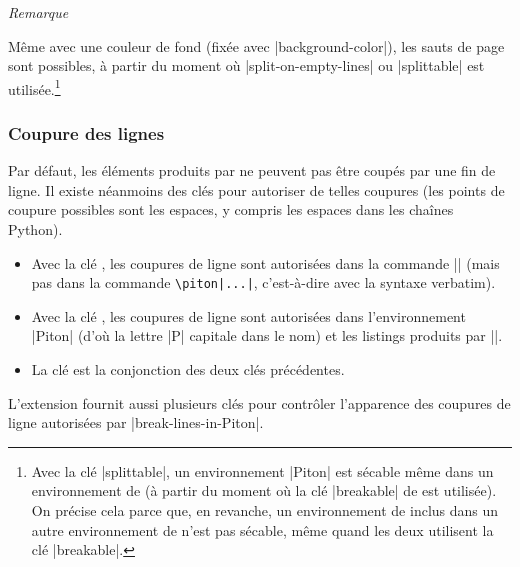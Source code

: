 \documentclass[dvipsnames,svgnames]{article}
\begin{document}
\medskip
\emph{Remarque}\par\nobreak

Même avec une couleur de fond (fixée avec |background-color|), les sauts de page sont possibles, à partir du moment
où |split-on-empty-lines| ou |splittable| est utilisée.\footnote{Avec la clé |splittable|, un environnement
  |{Piton}| est sécable même dans un environnement de  (à partir du moment où la clé |breakable| de
   est utilisée). On précise cela parce que, en revanche, un environnement de  inclus
  dans un autre environnement de  n'est pas sécable, même quand les deux utilisent la clé
  |breakable|.}


\subsubsection{Coupure des lignes}

\label{line-breaks}

Par défaut, les éléments produits par  ne peuvent pas être coupés par une fin de ligne. Il existe
néanmoins des clés pour autoriser de telles coupures (les points de coupure possibles sont les espaces, y compris
les espaces dans les chaînes Python).
\begin{itemize}
\item {} Avec la clé , les coupures de ligne sont autorisées dans la commande
|| (mais pas dans la commande \verb+\piton|...|+, c'est-à-dire avec la syntaxe verbatim). 

\item {} Avec la clé , les coupures de ligne sont autorisées dans l'environnement
|{Piton}| (d'où la lettre |P| capitale dans le nom) et les listings produits par |\PitonInputFile|.

\item {} La clé  est la conjonction des deux clés précédentes.
\end{itemize}

\medskip
L'extension  fournit aussi plusieurs clés pour contrôler l'apparence des coupures de ligne autorisées par |break-lines-in-Piton|.
\end{document}
